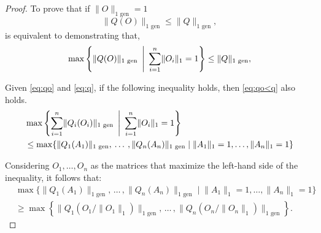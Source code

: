 \begin{proof}
To prove that  if  $\lVert O \rVert_{1 \text{ gen}} = 1$
\begin{equation} \label{eq:qo<q}
  \lVert Q(O) \rVert_{1 \text{ gen}} \leq \lVert Q \rVert_{1 \text{ gen}},
\end{equation}
is equivalent to demonstrating that,
\begin{equation}
 \max \left\{ \lVert Q(O) \rVert_{1 \text{ gen}} \hspace{2pt}  \Biggm| \hspace{2pt}  \sum_{i=1}^{n} \lVert O_i  \rVert_1 = 1 \right\} \leq \lVert Q \rVert_{1 \text{ gen}},
\end{equation}

Given \autoref{eq:qo} and \autoref{eq:q}, if the following inequality holds, then \autoref{eq:qo<q} also holds.
\begin{equation}
  \begin{split}
    &\max \left\{   \sum_{i=1}^{n} \lVert Q_{i} (O_{i}) \rVert_{1 \text{ gen}} \hspace{2pt}  \Biggm| \hspace{2pt}  \sum_{i=1}^{n} \lVert O_i  \rVert_1 = 1 \right\}  \\
    & \leq \max \{   \lVert Q_{1} (A_{1}) \rVert_{1  \text{ gen}}, \hspace{2pt} \ldots \hspace{2pt},  \lVert Q_{n} (A_{n}) \rVert_{1  \text{ gen}} \mid   \lVert A_{1} \rVert_{1} = 1 , \ldots,\lVert A_{n} \rVert_{1} = 1\}   \\
  \end{split}
\end{equation}

Considering $O_1, \ldots, O_n$ as the matrices that maximize the left-hand side of the inequality, it follows that:
\begin{equation}
  \begin{split}
    & \max \{   \lVert Q_{1} (A_{1}) \rVert_{1  \text{ gen}}, \hspace{2pt} \ldots \hspace{2pt},  \lVert Q_{n} (A_{n}) \rVert_{1  \text{ gen}} \mid   \lVert A_{1} \rVert_{1} = 1 , \ldots,\lVert A_{n} \rVert_{1} = 1\} \\
    &\geq  \max \left\{    \lVert Q_{1} (O_{1} / \lVert O_{1} \rVert_1) \rVert_{1  \text{ gen}}, \hspace{2pt} \ldots \hspace{2pt},   \lVert Q_{n} (O_{n}/ \lVert O_{n} \rVert_1) \rVert_{1  \text{ gen}} \right\} .
  \end{split}
  \end{equation}


\end{proof}
